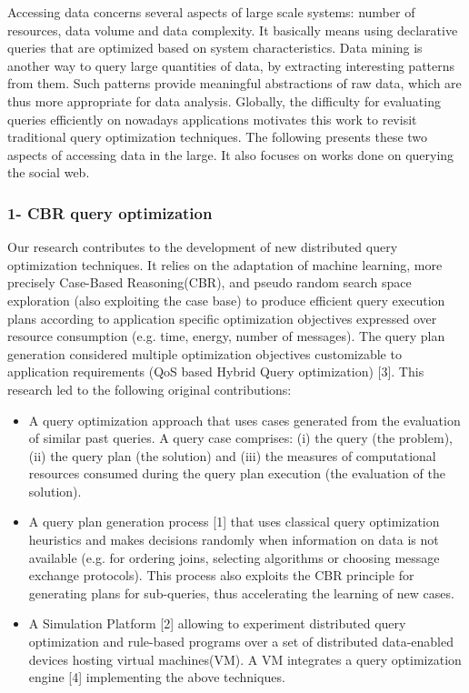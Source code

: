 Accessing data concerns several aspects of large scale systems: number of resources, data volume and data complexity. It basically means using declarative queries that are optimized based on system characteristics.
Data mining is another way to query large quantities of data, by extracting interesting patterns from them. Such patterns provide meaningful abstractions of raw data, which are thus more appropriate for data analysis. 
Globally, the difficulty for evaluating queries efficiently on nowadays applications motivates this work to revisit traditional query optimization techniques. The following presents these two aspects of accessing data in the large. It also focuses on works done on querying the social web. 

\subsubsection*{1- CBR query optimization}

Our research contributes to the development of new distributed query optimization techniques. It relies on the adaptation of machine learning, more precisely Case-Based Reasoning(CBR), and pseudo random search space exploration (also exploiting the case base) to produce efficient  query execution plans according to application specific optimization objectives expressed over resource consumption (e.g. time, energy, number of messages).  The query plan generation considered multiple optimization objectives customizable to application requirements (QoS based Hybrid Query optimization) [3].
This research led to the following original contributions:
\begin{itemize}
\item  A query optimization approach that uses cases generated from the evaluation of similar past queries. A query case comprises: (i) the query (the problem), (ii) the query plan (the solution) and (iii) the measures of computational resources consumed during the query plan execution (the evaluation of the solution). 

\item  A query plan generation process [1] that uses classical query optimization heuristics and makes decisions randomly when information on data is not available (e.g. for ordering joins, selecting algorithms or choosing message exchange protocols). This process also exploits the CBR principle for generating plans for sub-queries, thus accelerating the learning of new cases. 

\item  A Simulation Platform [2] allowing to experiment distributed query optimization and rule-based programs over a set of distributed data-enabled devices hosting virtual machines(VM). A VM integrates a query optimization engine [4] implementing the above techniques. 
\end{itemize}


